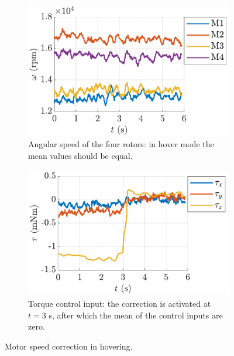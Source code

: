 \begin{figure}[!h]
  \centering
  \begin{subfigure}[t]{.48\textwidth}
    \centering
    \includegraphics[width=\linewidth]{Fig/motor_offset_2.pdf}
  \caption{Angular speed of the four rotors: in hover mode the mean values should be equal. }\label{fig:motors2}
  \end{subfigure}
  \hspace{0.3cm}
  \begin{subfigure}[t]{.48\textwidth}
    \centering
    \includegraphics[width=\linewidth]{Fig/motor_offset.pdf}
  \caption{Torque control input: the correction is activated at $t=3$ s, after which the mean of the control inputs are zero.}\label{fig:motors}
  \end{subfigure}%
  \caption{Motor speed correction in hovering.}
  \label{fig:motor}
  \end{figure}

